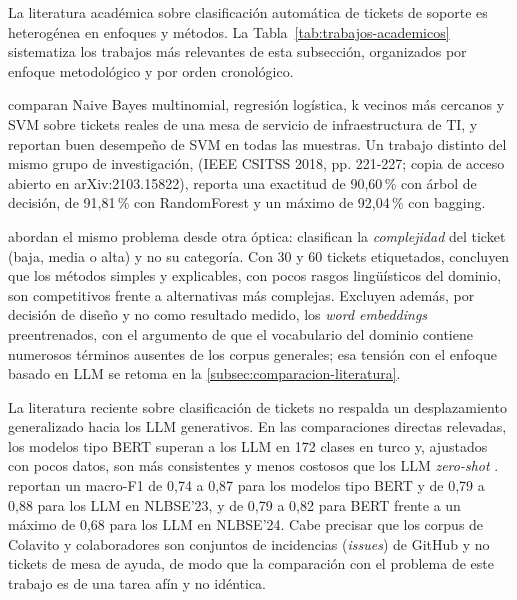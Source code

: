 La literatura académica sobre clasificación automática de tickets de soporte es heterogénea en enfoques y métodos. La Tabla~\ref{tab:trabajos-academicos} sistematiza los trabajos más relevantes de esta subsección, organizados por enfoque metodológico y por orden cronológico.

\textcite{Paramesh2019_it_service_desk} comparan Naive Bayes multinomial, regresión logística, k vecinos más cercanos y SVM sobre tickets reales de una mesa de servicio de infraestructura de TI, y reportan buen desempeño de SVM en todas las muestras. Un trabajo distinto del mismo grupo de investigación, \textcite{Paramesh2018_csitss} (IEEE CSITSS 2018, pp. 221-227; copia de acceso abierto en arXiv:2103.15822), reporta una exactitud de 90,60\,\% con árbol de decisión, de 91,81\,\% con RandomForest y un máximo de 92,04\,\% con bagging.

\textcite{Revina2020_it_tickets} abordan el mismo problema desde otra óptica: clasifican la \emph{complejidad} del ticket (baja, media o alta) y no su categoría. Con 30 y 60 tickets etiquetados, concluyen que los métodos simples y explicables, con pocos rasgos lingüísticos del dominio, son competitivos frente a alternativas más complejas. Excluyen además, por decisión de diseño y no como resultado medido, los \emph{word embeddings} preentrenados, con el argumento de que el vocabulario del dominio contiene numerosos términos ausentes de los corpus generales; esa tensión con el enfoque basado en LLM se retoma en la \autoref{subsec:comparacion-literatura}.

La literatura reciente sobre clasificación de tickets no respalda un desplazamiento generalizado hacia los LLM generativos. En las comparaciones directas relevadas, los modelos tipo BERT superan a los LLM en 172 clases en turco \parencite{paket2024itservice} y, ajustados con pocos datos, son más consistentes y menos costosos que los LLM \emph{zero-shot} \parencite{colavito2025benchmarking}. \textcite{colavito2025benchmarking} reportan un macro-F1 de 0,74 a 0,87 para los modelos tipo BERT y de 0,79 a 0,88 para los LLM en NLBSE'23, y de 0,79 a 0,82 para BERT frente a un máximo de 0,68 para los LLM en NLBSE'24. Cabe precisar que los corpus de Colavito y colaboradores son conjuntos de incidencias (\emph{issues}) de GitHub y no tickets de mesa de ayuda, de modo que la comparación con el problema de este trabajo es de una tarea afín y no idéntica.

